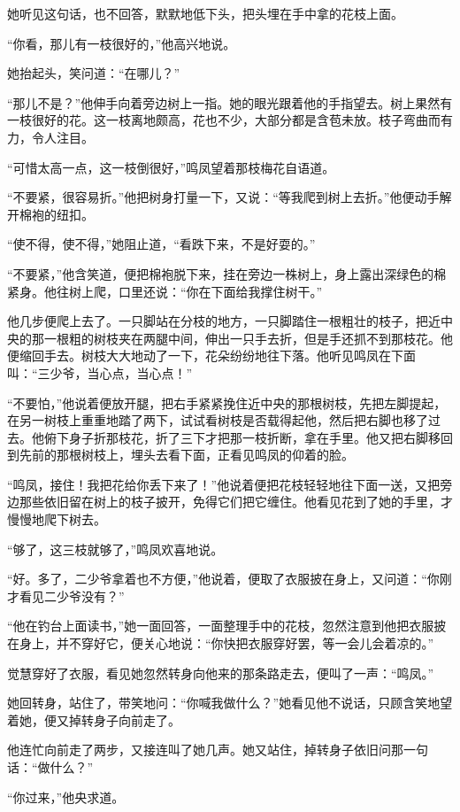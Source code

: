 \par 她听见这句话，也不回答，默默地低下头，把头埋在手中拿的花枝上面。
\par “你看，那儿有一枝很好的，”他高兴地说。
\par 她抬起头，笑问道：“在哪儿？”
\par “那儿不是？”他伸手向着旁边树上一指。她的眼光跟着他的手指望去。树上果然有一枝很好的花。这一枝离地颇高，花也不少，大部分都是含苞未放。枝子弯曲而有力，令人注目。
\par “可惜太高一点，这一枝倒很好，”鸣凤望着那枝梅花自语道。
\par “不要紧，很容易折。”他把树身打量一下，又说：“等我爬到树上去折。”他便动手解开棉袍的纽扣。
\par “使不得，使不得，”她阻止道，“看跌下来，不是好耍的。”
\par “不要紧，”他含笑道，便把棉袍脱下来，挂在旁边一株树上，身上露出深绿色的棉紧身。他往树上爬，口里还说：“你在下面给我撑住树干。”
\par 他几步便爬上去了。一只脚站在分枝的地方，一只脚踏住一根粗壮的枝子，把近中央的那一根粗的树枝夹在两腿中间，伸出一只手去折，但是手还抓不到那枝花。他便缩回手去。树枝大大地动了一下，花朵纷纷地往下落。他听见鸣凤在下面叫：“三少爷，当心点，当心点！”
\par “不要怕，”他说着便放开腿，把右手紧紧挽住近中央的那根树枝，先把左脚提起，在另一树枝上重重地踏了两下，试试看树枝是否载得起他，然后把右脚也移了过去。他俯下身子折那枝花，折了三下才把那一枝折断，拿在手里。他又把右脚移回到先前的那根树枝上，埋头去看下面，正看见鸣凤的仰着的脸。
\par “鸣凤，接住！我把花给你丢下来了！”他说着便把花枝轻轻地往下面一送，又把旁边那些依旧留在树上的枝子披开，免得它们把它缠住。他看见花到了她的手里，才慢慢地爬下树去。
\par “够了，这三枝就够了，”鸣凤欢喜地说。
\par “好。多了，二少爷拿着也不方便，”他说着，便取了衣服披在身上，又问道：“你刚才看见二少爷没有？”
\par “他在钓台上面读书，”她一面回答，一面整理手中的花枝，忽然注意到他把衣服披在身上，并不穿好它，便关心地说：“你快把衣服穿好罢，等一会儿会着凉的。”
\par 觉慧穿好了衣服，看见她忽然转身向他来的那条路走去，便叫了一声：“鸣凤。”
\par 她回转身，站住了，带笑地问：“你喊我做什么？”她看见他不说话，只顾含笑地望着她，便又掉转身子向前走了。
\par 他连忙向前走了两步，又接连叫了她几声。她又站住，掉转身子依旧问那一句话：“做什么？”
\par “你过来，”他央求道。
